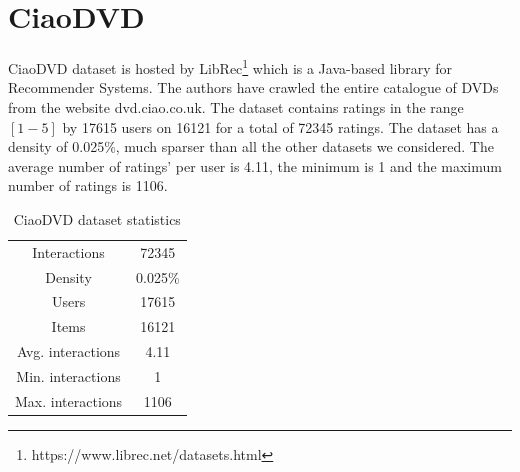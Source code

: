 \section{CiaoDVD}
CiaoDVD dataset\cite{guo2014etaf} is hosted by LibRec\footnote{https://www.librec.net/datasets.html} which is a Java-based library for Recommender Systems. The authors have crawled the entire catalogue of DVDs from the website dvd.ciao.co.uk. The dataset contains ratings in the range $[1-5]$ by 17615 users on 16121 for a total of 72345 ratings. The dataset has a density of 0.025\%, much sparser than all the other datasets we considered. The average number of ratings' per user is 4.11, the minimum is 1 and the maximum number of ratings is 1106.

\begin{table}[h!]
    \centering
    \begin{tabular}{c|c}
        \hline
        Interactions & 72345 \\
        Density & 0.025\% \\
        Users & 17615 \\
        Items & 16121 \\
        Avg. interactions & 4.11 \\
        Min. interactions & 1 \\
        Max. interactions & 1106 \\
        \hline
    \end{tabular}
    \caption{CiaoDVD dataset statistics}
    \label{tab:ciao_stats}
\end{table}

